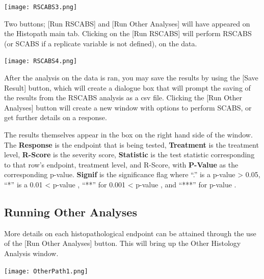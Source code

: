 \documentclass[a4paper]{article}
\begin{document}
\label{fig:RunButton} 
\begin{center}
\texttt{[image: RSCABS3.png]}
\end{center} 
\par

Two buttons; [Run RSCABS] and [Run Other Analyses] will have appeared on the Histopath main tab. Clicking on the 
[Run RSCABS] will perform RSCABS (or SCABS if a replicate variable is not defined), on the data. 
 
 
\hypertarget{fig:Results}{} 
\begin{center}
\texttt{[image: RSCABS4.png]}
\end{center} 
\par


 After the analysis on the data is ran, you may save the results
 by using the [Save Result] button, which will create a dialogue box that 
will prompt the saving of the results from the RSCABS analysis as a csv file. 
Clicking the [Run Other Analyses] button will create a new window with options to perform SCABS, or get further 
details on a response.

 \par
The results themselves appear in the box on the right hand side of the window. The \textbf{Response} is the endpoint that is being tested, \textbf{Treatment} 
is the treatment level, \textbf{R-Score} is the severity score, \textbf{Statistic} is the test statistic corresponding to
that row's endpoint, treatment level, 
and R-Score, with \textbf{P-Value} as the corresponding p-value. \textbf{Signif} is the
 significance flag where ``.'' is a p-value > 0.05, ``*'' is
 a 0.01 < p-value \le {}, ``**'' for 0.001 < p-value \le {}, and ``***'' for p-value \le {}.     




\subsection*{Running Other Analyses}
\label{subsec:OtherAnly}
   
More details on each histopathological endpoint can be attained through the use of the [Run Other Analyses] button. 
	This will bring up the Other Histology Analysis window.


\begin{center}
\texttt{[image: OtherPath1.png]}
\end{center} 
\par
	
\end{document}
